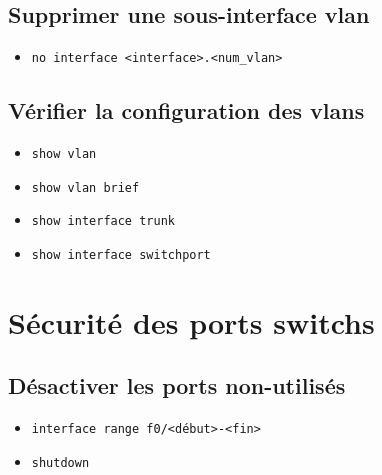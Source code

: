 \documentclass[a4paper]{article}
\begin{document}
\subsection{Supprimer une sous-interface vlan}



\begin{itemize}[label=\textbf{–}]
    \item \texttt{no interface <interface>.<num\_vlan>}
\end{itemize}





\subsection{Vérifier la configuration des vlans}



\begin{itemize}[label=\textbf{–}]
    \item \texttt{show vlan}
    \item \texttt{show vlan brief}
    \item \texttt{show interface trunk}
    \item \texttt{show interface switchport}
\end{itemize}










\section{Sécurité des ports switchs}





\subsection{Désactiver les ports non-utilisés}



\begin{itemize}[label=\textbf{–}]
    \item \texttt{interface range f0/<début>-<fin>}
    \item \texttt{shutdown}
\end{itemize}
\end{document}

